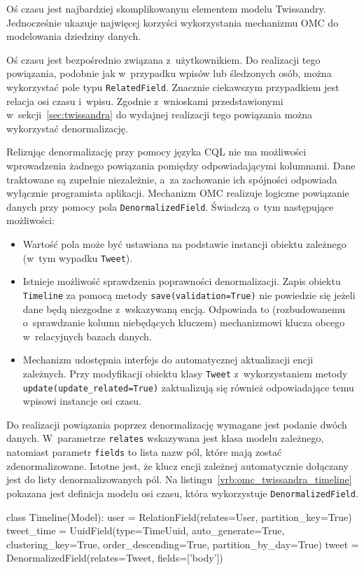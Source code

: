 Oś czasu jest najbardziej skomplikowanym elementem modelu Twissandry. Jednocześnie ukazuje najwięcej korzyści wykorzystania mechanizmu OMC do modelowania dziedziny danych. 

Oś czasu jest bezpośrednio związana z~użytkownikiem. Do realizacji tego powiązania, podobnie jak w~przypadku wpisów lub śledzonych osób, można wykorzystać pole typu \verb+RelatedField+. Znacznie ciekawszym przypadkiem jest relacja osi czasu i~wpisu. Zgodnie z~wnioskami przedstawionymi w~sekcji~\ref{sec:twissandra} do wydajnej realizacji tego powiązania można wykorzystać denormalizację. 

Relizując denormalizację przy pomocy języka CQL nie ma możliwości wprowadzenia żadnego powiązania pomiędzy odpowiadającymi kolumnami. Dane traktowane są zupełnie niezależnie, a~za zachowanie ich spójności odpowiada wyłącznie programista aplikacji. Mechanizm OMC realizuje logiczne powiązanie danych przy pomocy pola \verb+DenormalizedField+. Świadczą o~tym następujące możliwości:

\begin{itemize}
	\item Wartość pola może być ustawiana na podstawie instancji obiektu zależnego (w~tym wypadku \verb+Tweet+).
	\item Istnieje możliwość sprawdzenia poprawności denormalizacji. Zapis obiektu \verb+Timeline+ za pomocą metody \verb+save(validation=True)+ nie powiedzie się jeżeli dane będą niezgodne z~wskazywaną encją. Odpowiada to (rozbudowanemu o~sprawdzanie kolumn niebędących kluczem) mechanizmowi klucza obcego w~relacyjnych bazach danych.
	\item Mechanizm udostępnia interfejs do automatycznej aktualizacji encji zależnych. Przy modyfikacji obiektu klasy \verb+Tweet+ z~wykorzystaniem metody \verb+update(update_related=True)+ zaktualizują się również odpowiadające temu wpisowi instancje osi czasu.
\end{itemize}

Do realizacji powiązania poprzez denormalizację wymagane jest podanie dwóch danych. W~parametrze \verb+relates+ wskazywana jest klasa modelu zależnego, natomiast parametr \verb+fields+ to lista nazw pól, które mają zostać zdenormalizowane. Istotne jest, że klucz encji zależnej automatycznie dołączany jest do listy denormalizowanych pól. Na listingu~\ref{vrb:omc_twissandra_timeline} pokazana jest definicja modelu osi czasu, która wykorzystuje \verb+DenormalizedField+.

\begin{verbbox}
	class Timeline(Model):
	    user = RelationField(relates=User,
	                         partition_key=True)
	    tweet_time = UuidField(type=TimeUuid, 
	                           auto_generate=True,
	                           clustering_key=True,
	                           order_descending=True,
	                           partition_by_day=True)
	    tweet = DenormalizedField(relates=Tweet,
	                              fields=['body'])
\end{verbbox}

